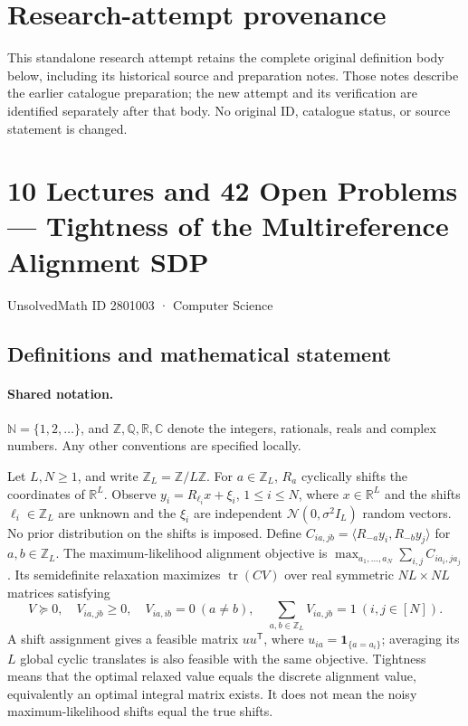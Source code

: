 \documentclass[11pt]{article}
\begin{document}
\section*{Research-attempt provenance}
This standalone research attempt retains the complete original definition body below,
including its historical source and preparation notes. Those notes describe the
earlier catalogue preparation; the new attempt and its verification are identified
separately after that body. No original ID, catalogue status, or source statement is changed.

\section{10 Lectures and 42 Open Problems — Tightness of the Multireference Alignment SDP}\label{2801003}
{\small UnsolvedMath ID 2801003 · Computer Science}
\subsection{Definitions and mathematical statement}

\paragraph{Shared notation.}$\mathbb N=\{1,2,\ldots\}$, and $\mathbb Z,\mathbb Q,\mathbb R,\mathbb C$ denote the integers, rationals, reals and complex numbers. Any other conventions are specified locally.


Let $L,N\ge1$, and write $\mathbb Z_L=\mathbb Z/L\mathbb Z$. For $a\in\mathbb Z_L$, $R_a$ cyclically shifts the coordinates of $\mathbb R^L$. Observe $y_i=R_{\ell_i}x+\xi_i$, $1\le i\le N$, where $x\in\mathbb R^L$ and the shifts $\ell_i\in\mathbb Z_L$ are unknown and the $\xi_i$ are independent $\mathcal N(0,\sigma^2 I_L)$ random vectors. No prior distribution on the shifts is imposed. Define $C_{ia,jb}=\langle R_{-a}y_i,R_{-b}y_j\rangle$ for $a,b\in\mathbb Z_L$. The maximum-likelihood alignment objective is $\max_{a_1,\ldots,a_N}\sum_{i,j}C_{ia_i,ja_j}$. Its semidefinite relaxation maximizes $\operatorname{tr}(CV)$ over real symmetric $NL\times NL$ matrices satisfying \[V\succeq0,\quad V_{ia,jb}\ge0,\quad V_{ia,ib}=0\ (a\ne b),\quad \sum_{a,b\in\mathbb Z_L}V_{ia,jb}=1\ (i,j\in[N]).\] A shift assignment gives a feasible matrix $u u^\mathsf T$, where $u_{ia}=\mathbf1_{\{a=a_i\}}$; averaging its $L$ global cyclic translates is also feasible with the same objective. Tightness means that the optimal relaxed value equals the discrete alignment value, equivalently an optimal integral matrix exists. It does not mean the noisy maximum-likelihood shifts equal the true shifts.
\end{document}
